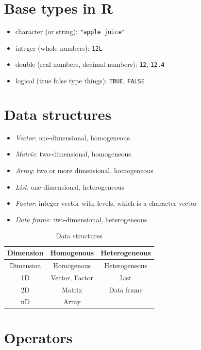 \documentclass[
]{book}
\providecommand{\tightlist}{%
  \setlength{\itemsep}{0pt}\setlength{\parskip}{0pt}}
\begin{document}
\hypertarget{base-types-in-r}{%
\section{Base types in R}\label{base-types-in-r}}

\begin{itemize}
\tightlist
\item
  character (or string): \texttt{"apple\ juice"}
\item
  integer (whole numbers): \texttt{12L}
\item
  double (real numbers, decimal numbers): \texttt{12}, \texttt{12.4}
\item
  logical (true false type things): \texttt{TRUE}, \texttt{FALSE}
\end{itemize}

\hypertarget{data-structures-1}{%
\section{Data structures}\label{data-structures-1}}

\begin{itemize}
\tightlist
\item
  \emph{Vector}: one-dimensional, homogeneous
\item
  \emph{Matrix}: two-dimensional, homogeneous
\item
  \emph{Array}: two or more dimensional, homogeneous
\item
  \emph{List}: one-dimensional, heterogeneous
\item
  \emph{Factor}: integer vector with levels, which is a character vector
\item
  \emph{Data frame}: two-dimensional, heterogeneous
\end{itemize}

\begin{longtable}[]{@{}ccc@{}}
\caption{Data structures}\tabularnewline
\toprule
Dimension & Homogenous & Heterogeneous\tabularnewline
\midrule
\endfirsthead
\toprule
Dimension & Homogenous & Heterogeneous\tabularnewline
\midrule
\endhead
1D & Vector, Factor & List\tabularnewline
2D & Matrix & Data frame\tabularnewline
nD & Array &\tabularnewline
\bottomrule
\end{longtable}

\hypertarget{operators-1}{%
\section{Operators}\label{operators-1}}
\end{document}
